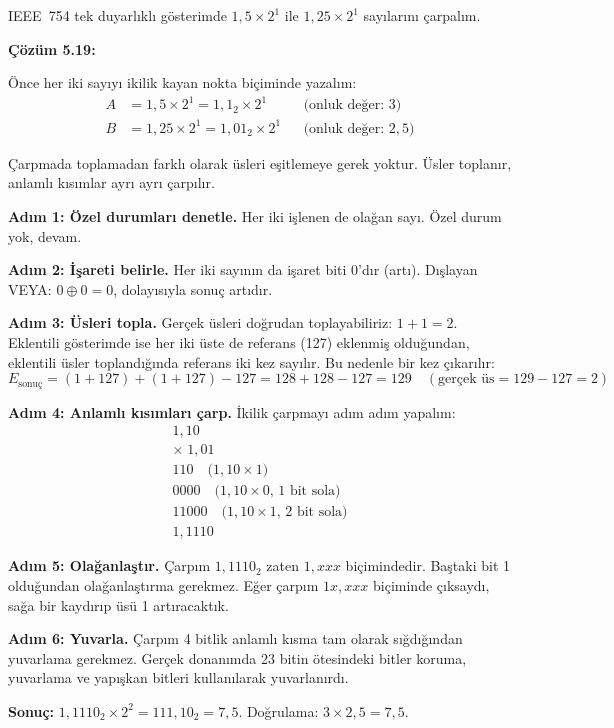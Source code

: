 \FloatBarrier
\begin{ornek}[5.19]
IEEE~754 tek duyarlıklı gösterimde $1{,}5 \times 2^{1}$ ile $1{,}25 \times 2^{1}$ sayılarını çarpalım.

\textbf{Çözüm 5.19:}

Önce her iki sayıyı ikilik kayan nokta biçiminde yazalım:
\begin{align*}
A &= 1{,}5 \times 2^{1} = 1{,}1_2 \times 2^{1} &&\text{(onluk değer: } 3\text{)} \\
B &= 1{,}25 \times 2^{1} = 1{,}01_2 \times 2^{1} &&\text{(onluk değer: } 2{,}5\text{)}
\end{align*}

Çarpmada toplamadan farklı olarak üsleri eşitlemeye gerek yoktur. Üsler toplanır, anlamlı kısımlar ayrı ayrı çarpılır.

\textbf{Adım 1: Özel durumları denetle.} Her iki işlenen de olağan sayı. Özel durum yok, devam.

\textbf{Adım 2: İşareti belirle.} Her iki sayının da işaret biti 0'dır (artı). Dışlayan VEYA: $0 \oplus 0 = 0$, dolayısıyla sonuç artıdır.

\textbf{Adım 3: Üsleri topla.} Gerçek üsleri doğrudan toplayabiliriz: $1 + 1 = 2$. Eklentili gösterimde ise her iki üste de referans (127) eklenmiş olduğundan, eklentili üsler toplandığında referans iki kez sayılır. Bu nedenle bir kez çıkarılır:
\[
E_\text{sonuç} = (1 + 127) + (1 + 127) - 127 = 128 + 128 - 127 = 129 \quad (\text{gerçek üs} = 129 - 127 = 2)
\]

\textbf{Adım 4: Anlamlı kısımları çarp.} İkilik çarpmayı adım adım yapalım:
\[
\begin{array}{r}
  1{,}10 \\
\times\; 1{,}01 \\
\hline
  110 \quad\text{(}1{,}10 \times 1\text{)}\\
 0000 \quad\text{(}1{,}10 \times 0\text{, 1 bit sola)}\\
11000 \quad\text{(}1{,}10 \times 1\text{, 2 bit sola)}\\
\hline
1{,}1110
\end{array}
\]

\textbf{Adım 5: Olağanlaştır.} Çarpım $1{,}1110_2$ zaten $1{,}xxx$ biçimindedir. Baştaki bit 1 olduğundan olağanlaştırma gerekmez. Eğer çarpım $1x{,}xxx$ biçiminde çıksaydı, sağa bir kaydırıp üsü 1 artıracaktık.

\textbf{Adım 6: Yuvarla.} Çarpım 4 bitlik anlamlı kısma tam olarak sığdığından yuvarlama gerekmez. Gerçek donanımda 23 bitin ötesindeki bitler koruma, yuvarlama ve yapışkan bitleri kullanılarak yuvarlanırdı.

\textbf{Sonuç:} $1{,}1110_2 \times 2^{2} = 111{,}10_2 = 7{,}5$. Doğrulama: $3 \times 2{,}5 = 7{,}5$. \checkmark
\end{ornek}

